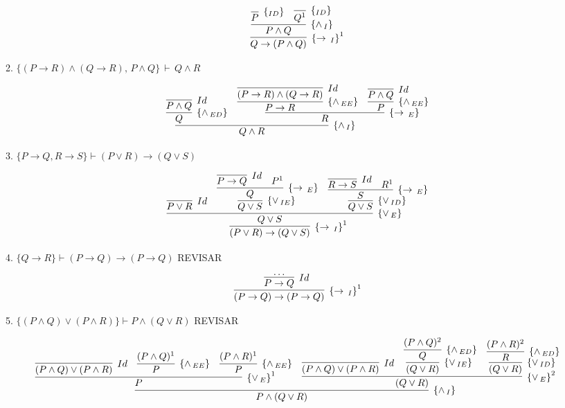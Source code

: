 \begin{enumerate}
\begin{enumerate}
	\[
		\infer[\impI^1]
			{Q\rightarrow(P\land Q)}
			{
				\infer[\andI]
					{P\land Q}
					{
						\infer[\Id]
							{P}
							{}
						&
						\infer[\Id]
							{Q^1}
							{}
					}
			}
	\]
	
	\item $\{(P\rightarrow R)\land (Q\rightarrow R),\, P\land Q\}\,\vdash\, Q\land R$
	
	\[
		\infer[\andI]
			{Q\land R}
			{
				\infer[\andED]
					{Q}
					{
						\infer[Id]
							{P \land Q}
							{}
					}
				&
				\infer[\impE]
					{R}
					{
						\infer[\andEE]
							{P \to R}
							{
								\infer[Id]
									{(P \to R)\land(Q \to R)}
									{}
							}
						&
						\infer[\andEE]
							{P}
							{
								\infer[Id]
									{P \land Q}
									{}
							}
					}
			}
	\]
	
	\item $\{P\rightarrow Q, R\rightarrow S\}\vdash (P\lor R)\rightarrow (Q\lor S)$
	
	\[
		\infer[\impI^1]
			{(P \lor R) \to (Q \lor S)}
			{
				\infer[\orE]
					{Q \lor S}
					{
						\infer[Id]
							{P \lor R}
							{} &
						\infer[\orIE]
							{Q \lor S }
							{
								\infer[\impE]
									{Q}
									{
										\infer[Id]
											{P \to Q}
											{}
										&
										P^1
									}
							} &
						\infer[\orID]
							{Q \lor S }
							{
								\infer[\impE]
									{S}
									{
										\infer[Id]
											{R \to S}
											{}
										&
										R^1
									}
							}
					}
			}
	\]
	
	\item $\{Q\rightarrow R\}\vdash (P\rightarrow Q)\rightarrow(P\rightarrow Q)$ REVISAR
	
	\[
		\infer[\impI^1]
			{(P \to Q) \to (P \to Q)}
			{
				\infer[Id]
					{P \to Q}
					{\ldots}
			}	
	\]
	
	\item $\{(P\land Q)\lor(P\land R)\}\vdash P\land(Q \lor R)$ REVISAR
	
	\[
		\infer[\andI]
			{P \land (Q \lor R)}
			{			
				\infer[\orE^1]
					{P}
					{
						\infer[Id]
							{(P\land Q)\lor(P\land R)}
							{}&
						\infer[\andEE]
							{P}
							{(P \land Q)^1}&
						\infer[\andEE]
							{P}
							{(P \land R)^1}
					}	
				&
				\infer[\orE^2]
					{(Q \lor R)}
					{
						\infer[Id]
							{(P\land Q)\lor(P\land R)}
							{}&
						\infer[\orIE]
							{(Q \lor R)}
							{
								\infer[\andED]
									{Q}
									{(P \land Q)^2}	
							}&
						\infer[\orID]
							{(Q \lor R)}
							{
								\infer[\andED]
									{R}
									{(P \land R)^2}
							}
					}	
			}	
	\]
	

\end{enumerate}
\end{enumerate}
